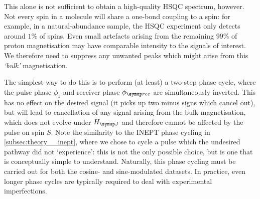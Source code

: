 This alone is not sufficient to obtain a high-quality HSQC spectrum, however.
Not every \proton{} spin in a molecule will share a one-bond coupling to a \carbon{} spin:  for example, in a natural-abundance sample, the HSQC experiment only detects around $1\%$ of \proton{} spins.
Even small artefacts arising from the remaining $99\%$ of proton magnetisation may have comparable intensity to the signals of interest.
We therefore need to suppress any unwanted peaks which might arise from this \textit{`bulk'} magnetisation.

The simplest way to do this is to perform (at least) a two-step phase cycle, where the pulse phase $\phi_1$ and receiver phase $\phirec$ are simultaneously inverted.
This has no effect on the desired signal (it picks up two minus signs which cancel out), but will lead to cancellation of any signal arising from the bulk magnetisation, which does not evolve under $\HJ$ and therefore cannot be affected by the pulse on spin $S$.
Note the similarity to the INEPT phase cycling in \cref{subsec:theory__inept}, where we chose to cycle a pulse which the undesired pathway did not `experience': this is not the only possible choice, but is one that is conceptually simple to understand.
Naturally, this phase cycling must be carried out for both the cosine- and sine-modulated datasets.
In practice, even longer phase cycles are typically required to deal with experimental imperfections.
